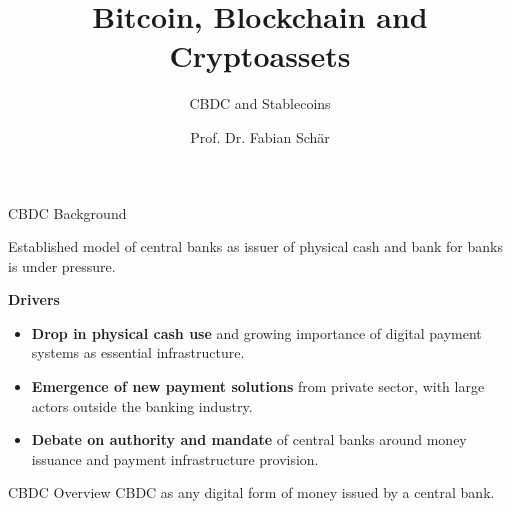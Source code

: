 \documentclass[handout]{beamer}
\title{Bitcoin, Blockchain and Cryptoassets}
\subtitle{CBDC and Stablecoins}
\author{Prof. Dr. Fabian Schär}
\institute{University of Basel}
\begin{document}
\thispagestyle{empty}
\begin{frame}[noframenumbering]
	\titlepage
\end{frame}


\begin{frame}{CBDC Background}

Established model of central banks as issuer of physical cash and bank for banks is under pressure.
\vspace{1.5em}	

\textbf{Drivers}
\begin{itemize}
	\item \textbf{Drop in physical cash use} and growing importance of digital payment systems as essential infrastructure.
	\item \textbf{Emergence of new payment solutions} from private sector, with large actors outside the banking industry.
	\item \textbf{Debate on authority and mandate} of central banks around money issuance and payment infrastructure provision.
\end{itemize}

\end{frame}


\begin{frame}{CBDC Overview}
CBDC as any \color{focus} digital form of money issued by a central bank. \color{black} 

\begin{center}
	\begin{tikzpicture}[scale=0.4, every node/.style ={scale=0.8}]
		
	\end{tikzpicture}
\end{center}



\end{frame}
\end{document}
